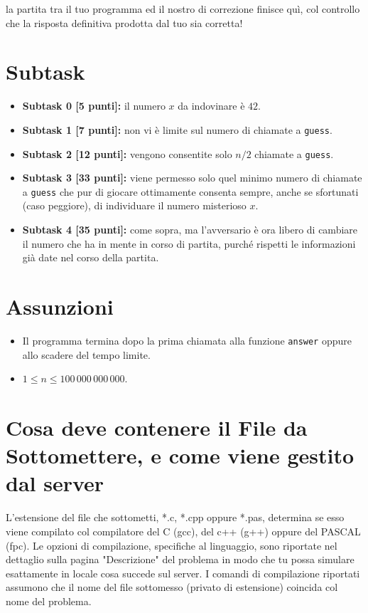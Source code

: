 \documentclass[a4paper,11pt]{article}
\begin{document}
  \vspace{0.2cm}
  
  \noindent
  la partita tra il tuo programma ed il nostro di correzione finisce quì,
  col controllo che la risposta definitiva prodotta dal tuo sia corretta!
  
  \section*{Subtask}
  \begin{itemize}
    \item \textbf{Subtask 0 [5 punti]:} il numero $x$ da indovinare è $42$.
    \item \textbf{Subtask 1 [7 punti]:} non vi è limite sul numero di chiamate a \texttt{guess}.
    \item \textbf{Subtask 2 [12 punti]:} vengono consentite solo $n/2$ chiamate a \texttt{guess}.
    \item \textbf{Subtask 3 [33 punti]:} viene permesso solo quel minimo numero di chiamate a \texttt{guess} che pur di giocare ottimamente consenta sempre, anche se sfortunati (caso peggiore), di individuare il numero misterioso $x$.
    \item \textbf{Subtask 4 [35 punti]:} come sopra, ma l'avversario è ora libero di cambiare il numero che ha in mente in corso di partita, purché rispetti le informazioni già date nel corso della partita.
  \end{itemize}
  
  \section*{Assunzioni}
  \begin{itemize}[nolistsep, noitemsep]
    \item Il programma termina dopo la prima chiamata alla funzione \texttt{answer} oppure allo scadere del tempo limite.
    \item $1 \le n \le 100\,000\,000\,000$.
  \end{itemize}

  \section*{Cosa deve contenere il File da Sottomettere, e come viene gestito dal server}

  L'estensione del file che sottometti, *.c, *.cpp oppure *.pas,
  determina se esso viene compilato col compilatore del C (gcc),
  del c++ (g++) oppure del PASCAL (fpc).
  Le opzioni di compilazione, specifiche al linguaggio,
  sono riportate nel dettaglio sulla pagina "Descrizione" del problema
  in modo che tu possa simulare esattamente in locale cosa succede sul server.
  I comandi di compilazione riportati assumono che il nome del file sottomesso (privato di estensione) coincida col nome del problema.
\end{document}
